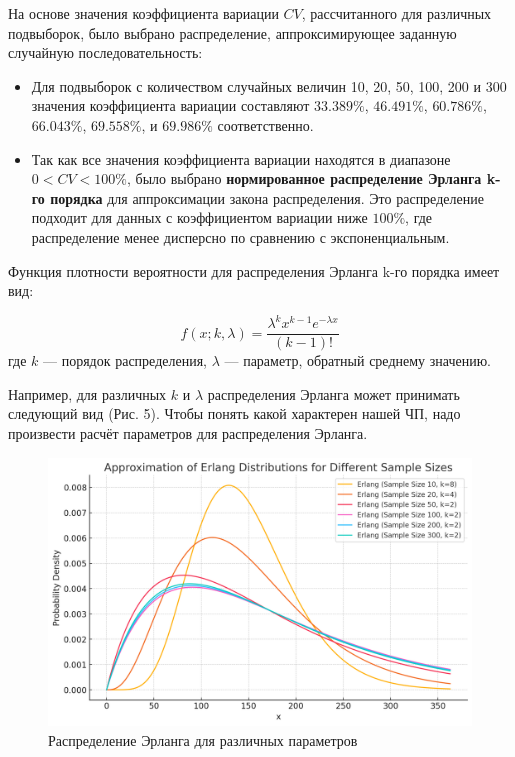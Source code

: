 На основе значения коэффициента вариации \(CV\), рассчитанного для различных подвыборок, было выбрано распределение, аппроксимирующее заданную случайную последовательность:

\begin{itemize}
	\item Для подвыборок с количеством случайных величин 10, 20, 50, 100, 200 и 300 значения коэффициента вариации составляют \(33.389\%\), \(46.491\%\), \(60.786\%\), \(66.043\%\), \(69.558\%\), и \(69.986\%\) соответственно.
	\item Так как все значения коэффициента вариации находятся в диапазоне \(0 < CV < 100\%\), было выбрано \textbf{нормированное распределение Эрланга k-го порядка} для аппроксимации закона распределения. Это распределение подходит для данных с коэффициентом вариации ниже \(100\%\), где распределение менее дисперсно по сравнению с экспоненциальным.
\end{itemize}

Функция плотности вероятности для распределения Эрланга k-го порядка имеет вид:

\[
	f(x; k, \lambda) = \frac{\lambda^k x^{k-1} e^{-\lambda x}}{(k-1)!}
\]
где \(k\) — порядок распределения, \(\lambda\) — параметр, обратный среднему значению.

Например, для различных $k$ и $\lambda$ распределения Эрланга может принимать следующий вид (Рис. 5). Чтобы понять какой характерен нашей ЧП, надо произвести расчёт параметров для распределения Эрланга.

\FloatBarrier
\begin{figure}[h]
	\centering
	\includegraphics[width=1\textwidth]{../data/histogram_example.png}
	\caption{Распределение Эрланга для различных параметров}
\end{figure}
\FloatBarrier

